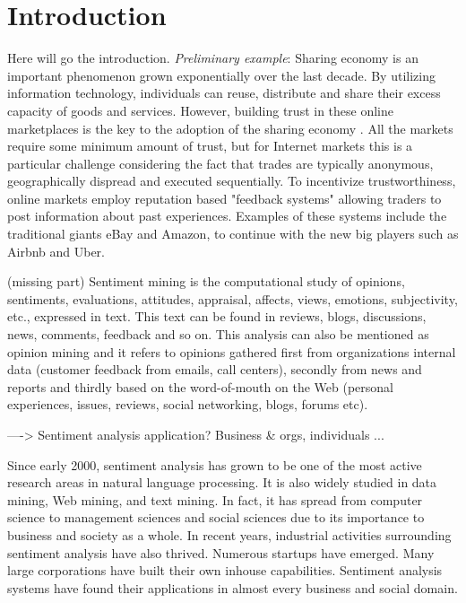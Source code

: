 \documentclass[a4paper, 11pt]{article}
\begin{document}
\section*{Introduction}

Here will go the introduction. \textit{Preliminary example}: Sharing economy is an important phenomenon grown exponentially over the last decade. By utilizing information technology, individuals can reuse, distribute and share their excess capacity of goods and services. However, building trust in these online marketplaces is the key to the adoption of the sharing economy \cite{owen2014trust}. All the markets require some minimum amount of trust, but for Internet markets this is a particular challenge considering the fact that trades are typically anonymous, geographically dispread and executed sequentially. To incentivize trustworthiness, online markets employ reputation based "feedback systems" allowing traders to post information about past experiences. Examples of these systems include the traditional giants eBay and Amazon, to continue with the new big players such as Airbnb and Uber.

(missing part)
Sentiment mining is the computational study of opinions, sentiments, evaluations, attitudes, appraisal, affects, views, emotions, subjectivity, etc., expressed in text. This text can be found in reviews, blogs, discussions, news, comments, feedback and so on. This analysis can also be mentioned as opinion mining and it refers to opinions gathered first from organizations internal data (customer feedback from emails, call centers), secondly from news and reports and thirdly based on the word-of-mouth on the Web (personal experiences, issues, reviews, social networking, blogs, forums etc). 

----> Sentiment analysis application? Business \& orgs, individuals ...

Since early 2000, sentiment analysis has grown to be one of the most
active research areas in natural language processing. It is also widely studied
in data mining, Web mining, and text mining. In fact, it has spread from
computer science to management sciences and social sciences due to its
importance to business and society as a whole. In recent years, industrial
activities surrounding sentiment analysis have also thrived. Numerous
startups have emerged. Many large corporations have built their own inhouse
capabilities. Sentiment analysis systems have found their applications
in almost every business and social domain.
\end{document}
